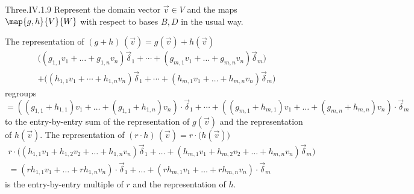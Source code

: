 \begin{ans}{Three.IV.1.9}
      Represent the domain vector $\vec{v}\in V$ and the maps
      $\map{g,h}{V}{W}$ with respect to bases $B,D$ in the usual way.
      \begin{exparts}
      \partsitem The representation of
         $(g+h)\,(\vec{v})=g(\vec{v})+h(\vec{v})$
        \begin{multline*}
          \bigl( (g_{1,1}v_1+\dots+g_{1,n}v_n)\vec{\delta}_1
                  +\cdots
                  +(g_{m,1}v_1+\dots+g_{m,n}v_n)\vec{\delta}_m \bigr) \\
           +\bigl( (h_{1,1}v_1+\cdots+h_{1,n}v_n)\vec{\delta}_1
                   +\cdots
                   +(h_{m,1}v_1+\dots+h_{m,n}v_n)\vec{\delta}_m \bigr)
         \end{multline*}
         regroups
         \begin{equation*}
          =((g_{1,1}+h_{1,1})v_1+\dots+
                 (g_{1,1}+h_{1,n})v_n)\cdot\vec{\delta}_1
            +\cdots
           +((g_{m,1}+h_{m,1})v_1+\dots+
                 (g_{m,n}+h_{m,n})v_n)\cdot\vec{\delta}_m
        \end{equation*}
        to the entry-by-entry
        sum of the representation of \( g(\vec{v}) \) and the representation of
        \( h(\vec{v}) \).
      \partsitem The representation of
        $(r\cdot h)\,(\vec{v})=r\cdot \bigl(h(\vec{v})\bigr)$
        \begin{multline*}
          r\cdot \bigl(
               (h_{1,1}v_1+h_{1,2}v_2+\dots+h_{1,n}v_n)\vec{\delta}_1
               +\dots
               +(h_{m,1}v_1+h_{m,2}v_2+\dots+h_{m,n}v_n)\vec{\delta}_m\bigr) \\
          =(rh_{1,1}v_1+\dots+rh_{1,n}v_n)\cdot\vec{\delta}_1
          +\dots
          +(rh_{m,1}v_1+\dots+rh_{m,n}v_n)\cdot\vec{\delta}_m
        \end{multline*}
        is the  entry-by-entry
        multiple of \( r \) and the representation of \( h \).
     \end{exparts}
   
\end{ans}
